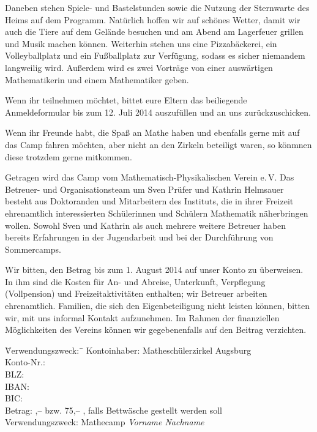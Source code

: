 \documentclass[12pt]{zettel}
\begin{document}
Daneben stehen Spiele- und Bastelstunden sowie die Nutzung der
Sternwarte des Heims auf dem Programm. Natürlich hoffen wir auf
schönes Wetter, damit wir auch die Tiere auf dem Gelände besuchen
und am Abend am Lagerfeuer grillen und Musik machen können.
Weiterhin stehen uns eine Pizzabäckerei, ein Volleyballplatz und ein
Fußballplatz zur Verfügung, sodass es sicher niemandem langweilig
wird. Außerdem wird es zwei Vorträge von
einer auswärtigen Mathematikerin und einem Mathematiker geben.

\vspace{\medskipamount}

\begin{minipage}{0.6\textwidth}
Wenn ihr teilnehmen möchtet, bittet eure Eltern das beiliegende Anmeldeformular
bis zum 12. Juli 2014 auszufüllen und an uns zurückzuschicken.
\end{minipage}

\vspace{\medskipamount}

\begin{minipage}{0.4\textwidth}
Wenn ihr Freunde
habt, die Spaß an Mathe haben und ebenfalls gerne mit auf das
Camp fahren möchten, aber nicht an den Zirkeln beteiligt waren, so
könmnen diese trotzdem gerne mitkommen.
\end{minipage}

\newpage

Getragen wird das Camp vom Mathematisch-Physikalischen Verein e.\,V. Das
Betreuer- und Organisationsteam um Sven Prüfer und Kathrin Helmsauer besteht
aus Doktoranden und Mitarbeitern des Instituts, die in ihrer Freizeit
ehrenamtlich interessierten Schülerinnen und Schülern Mathematik näherbringen
wollen. Sowohl Sven und Kathrin als auch mehrere weitere Betreuer haben
bereits Erfahrungen in der Jugendarbeit und bei der Durch\-füh\-rung von
Sommercamps.

Wir bitten, den Betrag bis zum 1. August 2014 auf unser Konto zu überweisen.
In ihm sind die Kosten für An- und Abreise, Unterkunft, Verpflegung
(Vollpension) und Freizeitaktivitäten enthalten; wir Betreuer arbeiten
ehrenamtlich. Familien, die sich den Eigenbeteiligung nicht leisten können, bitten
wir, mit uns informal Kontakt aufzunehmen. Im Rahmen der finanziellen Möglichkeiten des
Vereins können wir gegebenenfalls auf den Beitrag verzichten.

\vspace{-0.7em}
\begin{tabbing}
  \qquad\quad \= Verwendungszweck:\, \= \kill
  \> Kontoinhaber: \> Matheschülerzirkel Augsburg \\
  \> Konto-Nr.:  \\
  \> BLZ:  \\
  \> IBAN:  \\
  \> BIC:  \\
  \> Betrag: ,-- \texteuro{} bzw. 75,-- \texteuro, falls Bettwäsche
  gestellt werden soll \\
  \> Verwendungszweck: \> Mathecamp \emph{Vorname Nachname}
\end{tabbing}
\vspace{-0.7em}
\end{document}
